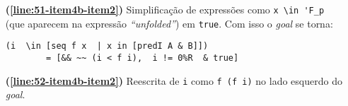 \begin{enumerate}[label=\textbf{\roman*.}]
\begin{enumerate}[label=\textbf{\roman{enumi}.(\alph*)}]
\begin{enumerate}[label=\textbf{(\alph{enumii}.\arabic*)}]
\begin{enumerate}[listparindent=\parindent]
\begin{itemize}
                                                \item[\textbf{(\ref{line:51-item4b-item2})}] Simplificação de expressões como \lstinline[language=coq]|x \in 'F_p| (que aparecem na expressão \textit{``unfolded''}) em \lstinline[language=coq]|true|. Com isso o \textit{goal} se torna:
                                                        \begin{lstlisting}[language=coq,frame=single,tabsize=1]
(i  \in [seq f x  | x in [predI A & B]]) 
        = [&& ~~ (i < f i),  i != 0%R  & true]
                                                        \end{lstlisting}
                                                        
                                                \item[\textbf{(\ref{line:52-item4b-item2})}] Reescrita de \lstinline[language=coq]|i| como \lstinline[language=coq]|f (f i)| no lado esquerdo do \textit{goal}.
                                                

\end{itemize}
\end{enumerate}
\end{enumerate}
\end{enumerate}
\end{enumerate}
